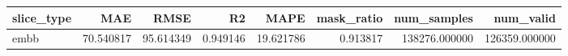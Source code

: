 \begin{tabular}{lrrrrrrr}
\toprule
slice_type & MAE & RMSE & R2 & MAPE & mask_ratio & num_samples & num_valid \\
\midrule
embb & 70.540817 & 95.614349 & 0.949146 & 19.621786 & 0.913817 & 138276.000000 & 126359.000000 \\
\bottomrule
\end{tabular}
